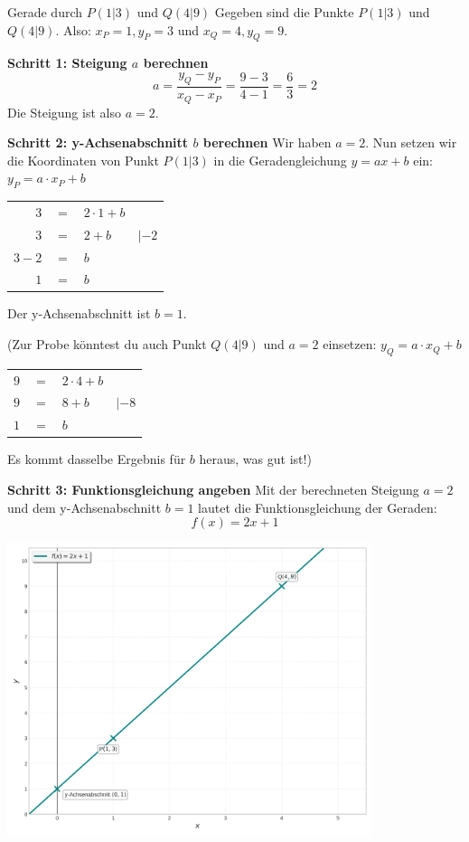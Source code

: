 \begin{beispielumgebung}{Gerade durch $P(1|3)$ und $Q(4|9)$}
Gegeben sind die Punkte $P(1|3)$ und $Q(4|9)$.
Also: $x_P = 1, y_P = 3$ und $x_Q = 4, y_Q = 9$.

\textbf{Schritt 1: Steigung $a$ berechnen}
\[ a = \frac{y_Q - y_P}{x_Q - x_P} = \frac{9 - 3}{4 - 1} = \frac{6}{3} = 2 \]
Die Steigung ist also $a=2$.

\textbf{Schritt 2: y-Achsenabschnitt $b$ berechnen}
Wir haben $a=2$. Nun setzen wir die Koordinaten von Punkt $P(1|3)$ in die Geradengleichung $y = ax + b$ ein:
$y_P = a \cdot x_P + b$
\begin{center}
\begin{tabular}{r @{\,} c @{\,} l @{\quad\quad} l}
$3$ & $=$ & $2 \cdot 1 + b$ & \\
$3$ & $=$ & $2 + b$ & $| -2$ \\
$3-2$ & $=$ & $b$ & \\
$1$ & $=$ & $b$ & \\
\end{tabular}
\end{center}
Der y-Achsenabschnitt ist $b=1$.

(Zur Probe könntest du auch Punkt $Q(4|9)$ und $a=2$ einsetzen:
$y_Q = a \cdot x_Q + b$
\begin{center}
\begin{tabular}{r @{\,} c @{\,} l @{\quad\quad} l}
$9$ & $=$ & $2 \cdot 4 + b$ & \\
$9$ & $=$ & $8 + b$ & $| -8$ \\
$1$ & $=$ & $b$ & \\
\end{tabular}
\end{center}
Es kommt dasselbe Ergebnis für $b$ heraus, was gut ist!)

\textbf{Schritt 3: Funktionsgleichung angeben}
Mit der berechneten Steigung $a=2$ und dem y-Achsenabschnitt $b=1$ lautet die Funktionsgleichung der Geraden:
\[ f(x) = 2x + 1 \]

\begin{center}
    \includegraphics[width=0.8\textwidth]{grafiken/Lineare_Funktion_aus_2_Punkten.png}
    \label{fig:gerade_aus_2_punkten}
\end{center}

\end{beispielumgebung}
